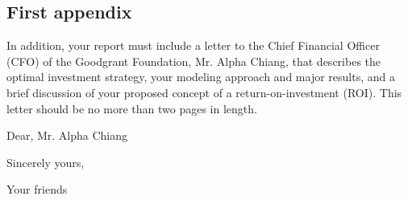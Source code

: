 \begin{appendices}
    \section{First appendix}

In addition, your report must include a letter to the Chief Financial Officer (CFO) of the Goodgrant Foundation, Mr. Alpha Chiang, that describes the optimal investment strategy, your modeling approach and major results, and a brief discussion of your proposed concept of a return-on-investment (ROI). This letter should be no more than two pages in length.

Dear, Mr. Alpha Chiang

\lipsum[1-2]

\vspace{\parskip}

Sincerely yours,

Your friends
\end{appendices}
